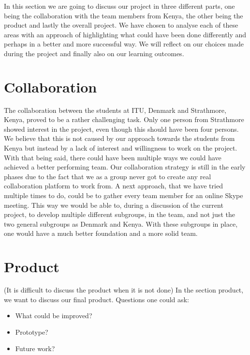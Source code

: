 In this section we are going to discuss our project in three different parts, one being the collaboration with the team members from Kenya, the other being the product and lastly the overall project. We have chosen to analyse each of these areas with an approach of highlighting what could have been done differently and perhaps in a better and more successful way. We will reflect on our choices made during the project and finally also on our learning outcomes.

\section{Collaboration}\label{sec:discussioncollaboration}
The collaboration between the students at ITU, Denmark and Strathmore, Kenya, proved to be a rather challenging task. Only one person from Strathmore showed interest in the project, even though this should have been four persons. We believe that this is not caused by our approach towards the students from Kenya but instead by a lack of interest and willingness to work on the project.
With that being said, there could have been multiple ways we could have achieved a better performing team. Our collaboration strategy is still in the early phases due to the fact that we as a group never got to create any real collaboration platform to work from. 
A next approach, that we have tried multiple times to do, could be to gather every team member for an online Skype meeting. This way we would be able to, during a discussion of the current project, to develop multiple different subgroups, in the team, and not just the two general subgroups as Denmark and Kenya. With these subgroups in place, one would have a much better foundation and a more solid team.

\section{Product}\label{sec:product}
(It is difficult to discuss the product when it is not done)
In the section product, we want to discuss our final product. Questions one could ask:

\begin{itemize}
	\item What could be improved?
	\item Prototype? %
	\item Future work?
\end{itemize}


